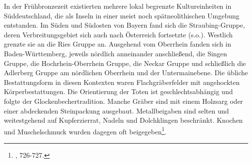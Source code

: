 \documentclass[openany,twoside,twocolumn]{book}
\let\rmarkdownfootnote\footnote%
\def\footnote{\protect\rmarkdownfootnote}
\begin{document}
In der Frühbronzezeit existierten mehrere lokal begrenzte
Kultureinheiten in Süddeutschland, die als Inseln in einer meist noch
spätneolithischen Umgebung entstanden. Im Süden und Südosten von Bayern
fand sich die Straubing-Gruppe, deren Verbreitungsgebiet sich auch nach
Österreich fortsetzte (s.o.). Westlich grenzte sie an die Ries Gruppe
an. Ausgehend vom Oberrhein fanden sich in Baden-Württemberg, jeweils
nördlich anneinander anschließend, die Singen Gruppe, die
Hochrhein-Oberrhein Gruppe, die Neckar Gruppe und schließlich die
Adlerberg Gruppe am nördlichen Oberrhein und der Untermainebene. Die
übliche Bestattungsform in diesen Kontexten waren Flachgräberfelder mit
angehockten Körperbestattungen. Die Orientierung der Toten ist
geschlechtsabhängig und folgte der Glockenbechertradition. Manche Gräber
sind mit einem Holzsarg oder einer abdeckenden Steinpackung ausgebaut.
Metallbeigaben sind selten und weitestgehend auf Kupferzierrat, Nadeln
und Dolchklingen beschränkt. Knochen und Muschelschmuck wurden dagegen
oft beigegeben\footnote{\textcite{jockenhovel_germany_2013}, 726-727.}.
\end{document}
